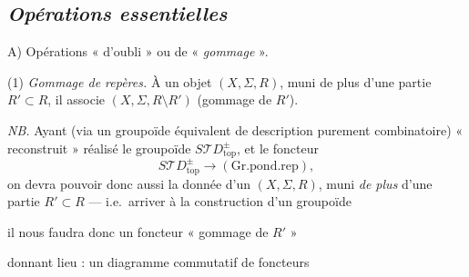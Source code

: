 \documentclass[11pt,a4paper]{article}
\begin{document}
\subsection*{\emph{Opérations essentielles}}

A) Opérations « d'oubli » ou de « \emph{gommage} ».

(1) \emph{Gommage de repères.} À un objet
$(X, \Sigma, R)$, muni de plus d'une partie $R' \subset R$, il associe
$(X, \Sigma, R \setminus R')$ (gommage de $R'$).

\emph{NB.} Ayant (via un groupoïde équivalent de description purement
combinatoire) « reconstruit »  réalisé le groupoïde
$S\mathcal{T}D^{\pm}_{\mathrm{top}}$, et le foncteur
\[
S\mathcal{T}D^{\pm}_{\mathrm{top}} \longrightarrow (\mathrm{Gr.pond.rep}),
\]
\struck{\ill{}} on devra pouvoir donc aussi 
\struck{\ill{}} la donnée d'un $(X, \Sigma, R)$, muni \emph{de plus} d'une
partie $R' \subset R$ --- \struck{\ill{}} i.e.\ arriver à la construction
d'un groupoïde


il nous faudra donc  un foncteur « gommage de $R'$ »


 donnant lieu : un diagramme commutatif de
foncteurs


\end{document}
